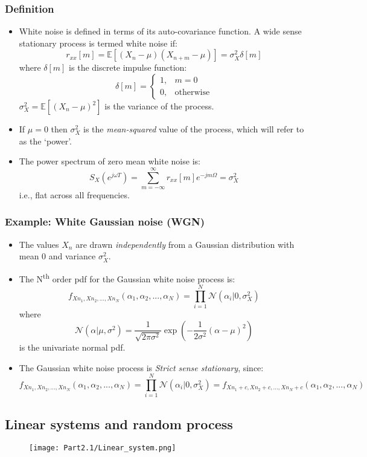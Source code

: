 \documentclass[12pt]{article}
\newcommand{\titc}[1]{\textit{\textcolor{blue1}{#1}}}
\newcommand{\sigd}{\sigma^2}
\newcommand{\mexp}{\mathbb{E}}
\newcommand{\summ}[2]{\sum_{#1}^{#2}}
\newcommand{\summinfinf}{\summ{m=-\infty}{\infty}}
\newcommand{\ps}{S_X}
\newcommand{\autocox}{r_{xx}}
\newcommand{\gau}{\mathcal{N}}
\begin{document}
\subsubsection{Definition}
\begin{itemize}
    \item White noise is defined in terms of its auto-covariance function. A wide sense stationary process is termed white noise if: 
    \[
    \autocox[m] = \mexp[(X_n -\mu)(X_{n+m}-\mu)] = \sigd_X \delta[m]
    \]
    where $\delta[m]$ is the discrete impulse function:
    \[
    \delta[m] = \left \{ \begin{array}{ll}
        1, & m=0  \\
        0, & \textrm{otherwise}
    \end{array}\right.
    \]
    $\sigd_X = \mexp[(X_n - \mu)^2]$ is the variance of the process. 
    \item If $\mu= 0$ then $\sigd_X$ is the \titc{mean-squared} value of the process, which will refer to as the `power'.
    \item The power spectrum of zero mean white noise is:
    \[
    \ps(e^{j\omega T}) = \summinfinf \autocox[m] e^{-jm\Omega} = \sigd_X
    \]
    i.e., flat across all frequencies. 
\end{itemize}
\subsubsection{Example: White Gaussian noise (WGN)}
\begin{itemize}
    \item The values $X_n$ are drawn \titc{independently} from a Gaussian distribution with mean 0 and variance $\sigd_X$.
    \item The N\textsuperscript{th} order pdf for the Gaussian white noise process is:
    \[
    f_{X{n_1},X{n_2},...,X{n_N}}(\alpha_1,\alpha_2,...,\alpha_N) = \prod_{i=1}^N \gau(\alpha_i|0,\sigd_X)
    \]
    where 
    \[
    \gau(\alpha|\mu,\sigd) = \frac{1}{\sqrt{2\pi \sigd}}\exp\left(-\frac{1}{2\sigd}(\alpha - \mu)^2 \right) 
    \]
    is the univariate normal pdf.
    \item The Gaussian white noise process is \titc{Strict sense stationary}, since:
    \[
    f_{X{n_1},X{n_2},...,X{n_N}}(\alpha_1,\alpha_2,...,\alpha_N) = \prod_{i=1}^N \gau(\alpha_i|0,\sigd_X) = f_{X{n_1+c},X{n_2+c},...,X{n_N+c}}(\alpha_1,\alpha_2,...,\alpha_N)
    \]
\end{itemize}
\subsection{Linear systems and random process}
\begin{figure}[H]
    \centering
    \texttt{[image: Part2.1/Linear\_system.png]}
\end{figure}
\end{document}
